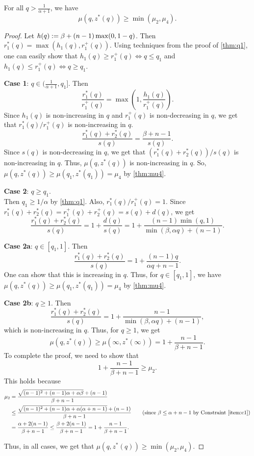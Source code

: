\begin{lemma}
\label{thm:4.2}
For all $q > \frac{1}{\alpha+1}$, we have
\[ \mu(q, z^*(q)) \ge \min(\mu_2, \mu_4). \]
\end{lemma}
\begin{proof}
Let $h(q) := \beta + (n-1)\max(0, 1-q)$.
Then $r_1^*(q) = \max(h_1(q), r_1^+(q))$.
Using techniques from the proof of \cref{thm:q1},
one can easily show that $h_1(q) \ge r_1^+(q) \iff q \le q_1$
and $h_1(q) \le r_1^+(q) \iff q \ge q_1$.

\textbf{Case 1}: $q \in (\frac{1}{\alpha+1}, q_1]$. Then
\[ \frac{r_1^*(q)}{r_1^+(q)} = \max\left(1, \frac{h_1(q)}{r_1^+(q)}\right). \]
Since $h_1(q)$ is non-increasing in $q$ and $r_1^+(q)$ is non-decreasing in $q$,
we get that $r_1^*(q)/r_1^+(q)$ is non-increasing in $q$.
\[ \frac{r_1^*(q)+r_2^*(q)}{s(q)} = \frac{\beta + n-1}{s(q)}. \]
Since $s(q)$ is non-decreasing in $q$, we get that $(r_1^*(q)+r_2^*(q))/s(q)$
is non-increasing in $q$. Thus,
$\mu(q, z^*(q))$ is non-increasing in $q$.
So, $\mu(q, z^*(q)) \ge \mu(q_1, z^*(q_1)) = \mu_4$
by \cref{thm:mu4}.

\textbf{Case 2}: $q \ge q_1$.
\\ Then $q_1 \ge 1/\alpha$ by \cref{thm:q1}.
Also, $r_1^*(q)/r_1^+(q) = 1$.
Since $r_1^*(q) + r_2^*(q) = r_1^+(q) + r_2^+(q) = s(q) + d(q)$, we get
\[ \frac{r_1^*(q)+r_2^*(q)}{s(q)} = 1 + \frac{d(q)}{s(q)}
= 1 + \frac{(n-1)\min(q, 1)}{\min(\beta, \alpha q) + (n-1)}. \]

\textbf{Case 2a}: $q \in [q_1, 1]$. Then
\[ \frac{r_1^*(q)+r_2^*(q)}{s(q)} = 1 + \frac{(n-1)q}{\alpha q + n-1}. \]
One can show that this is increasing in $q$.
Thus, for $q \in [q_1, 1]$, we have $\mu(q, z^*(q)) \ge \mu(q_1, z^*(q_1)) = \mu_4$
by \cref{thm:mu4}.

\textbf{Case 2b}: $q \ge 1$. Then
\[ \frac{r_1^*(q)+r_2^*(q)}{s(q)} = 1 + \frac{n-1}{\min(\beta, \alpha q) + (n-1)}, \]
which is non-increasing in $q$.
Thus, for $q \ge 1$, we get
\[ \mu(q, z^*(q)) \ge \mu(\infty, z^*(\infty)) = 1 + \frac{n-1}{\beta + n-1}. \]
To complete the proof, we need to show that
\[ 1 + \frac{n-1}{\beta+n-1} \ge \mu_2. \]
This holds because
\begin{align*}
\mu_2 &= \frac{\sqrt{(n-1)^2+(n-1)\alpha+\alpha\beta}+(n-1)}{\beta + n-1}
\\ &\le \frac{\sqrt{(n-1)^2+(n-1)\alpha+\alpha(\alpha + n-1)}+(n-1)}{\beta + n-1}
    \tag{since $\beta \le \alpha + n-1$ by Constraint \ref{item:c1}}
\\ &= \frac{\alpha+2(n-1)}{\beta + n-1}
    \le \frac{\beta+2(n-1)}{\beta + n-1}
    = 1 + \frac{n-1}{\beta + n-1}.
\end{align*}

Thus, in all cases, we get that $\mu(q, z^*(q)) \ge \min(\mu_2, \mu_4)$.
\end{proof}
